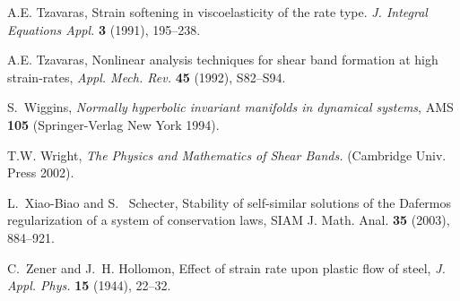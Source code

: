 \documentclass[a4paper,11pt]{article}
\numberwithin{step}{dummy}
\begin{document}
\begin{thebibliography}{10}
{\sc A.E. Tzavaras}, 
Strain softening in viscoelasticity of the rate type. 
{\it J. Integral Equations Appl.} {\bf  3}  (1991), 195--238.
  
{\sc A.E. Tzavaras}, 
Nonlinear analysis techniques for shear band formation at high strain-rates, 
{\it Appl. Mech. Rev.}
{\bf  45} (1992), S82--S94.

{\sc S.~Wiggins}, 
{\it Normally hyperbolic invariant manifolds in dynamical  systems}, AMS {\bf 105} (Springer-Verlag New York 1994).

{\sc T.W. Wright}, 
{\it The Physics and Mathematics of Shear Bands.} (Cambridge Univ. Press 2002).

{\sc L.~Xiao-Biao and S.~ Schecter},
{Stability of self-similar solutions of the {D}afermos regularization of a system of conservation laws},
{SIAM J. Math. Anal.}
{\bf 35} (2003), 884--921.

{\sc C.~Zener and J.~H. Hollomon}, 
Effect of strain rate upon plastic flow of steel,
{\it J. Appl. Phys.}
{\bf 15} (1944), 22--32.

\end{thebibliography}
\end{document}
